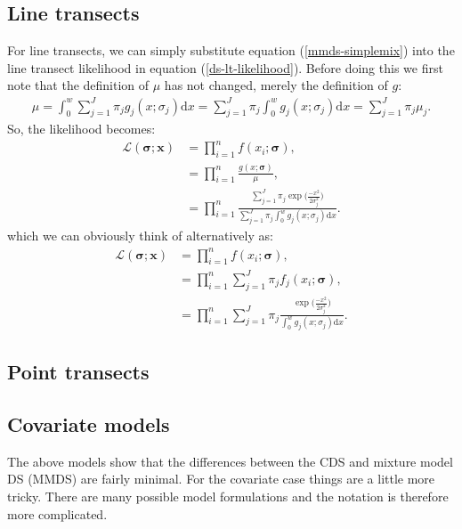 \subsection{Line transects}
For line transects, we can simply substitute equation (\ref{mmds-simplemix}) into the line transect likelihood in equation (\ref{ds-lt-likelihood}). Before doing this we first note that the definition of $\mu$ has not changed, merely the definition of $g$:
\begin{align*}
\mu = \int_0^w \sum_{j=1}^J \pi_j g_j(x;\sigma_j) \text{d}x = \sum_{j=1}^J \pi_j \int_0^w  g_j(x;\sigma_j) \text{d}x = \sum_{j=1}^J \pi_j \mu_j.
\end{align*}
So, the likelihood becomes:
\begin{align}
\mathcal{L}(\bm{\sigma}; \bm{x}) &= \prod_{i=1}^n f(x_i;\bm{\sigma}),\\
&= \prod_{i=1}^n \frac{g(x;\bm{\sigma})}{\mu},\\
&= \prod_{i=1}^n \frac{\sum_{j=1}^J \pi_j \exp \Big( \frac{-x^2}{2 \sigma_j^2}\Big)}{\sum_{j=1}^J \pi_j \int_0^w  g_j(x;\sigma_j) \text{d}x}.
\label{mmds-lt-likelihood}
\end{align}
which we can obviously think of alternatively as:
\begin{align}
\mathcal{L}(\bm{\sigma}; \bm{x}) &= \prod_{i=1}^n f(x_i;\bm{\sigma}),\\
&= \prod_{i=1}^n \sum_{j=1}^J \pi_j f_j(x_i;\bm{\sigma}),\\
&= \prod_{i=1}^n \sum_{j=1}^J \pi_j \frac{\exp \Big( \frac{-x^2}{2 \sigma_j^2}\Big)}{\int_0^w  g_j(x;\sigma_j) \text{d}x}.
\label{mmds-lt-likelihood}
\end{align}



\subsection{Point transects}

\subsection{Covariate models}
The above models show that the differences between the CDS and mixture model DS (MMDS) are fairly minimal. For the covariate case things are a little more tricky. There are many possible model formulations and the notation is therefore more complicated.

